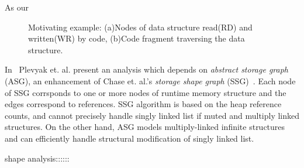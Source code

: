 As our  
%
%
\begin{figure}%
  \begin{center}
  \end{center}
  \caption{\label{fig:motiv} Motivating example: (a)Nodes of data structure read(RD) and written(WR) by code, (b)Code fragment traversing the data structure. }
\end{figure}


In~\cite{Plevyak93analysisof} Plevyak et. al. present an analysis which depends on \emph{abstract storage graph} (ASG), an enhancement of Chase et. al.'s \emph{storage shape graph} (SSG)~\cite{Chase90}. Each node of SSG corrsponds to one or more nodes of runtime memory structure and the edges correspond to references. SSG algorithm is based on the heap reference counts, and cannot precisely handle singly linked list if muted and multiply linked structures. On the other hand, ASG models multiply-linked infinite structures and can efficiently handle structural modification of singly linked list. 




shape analysis::::::


